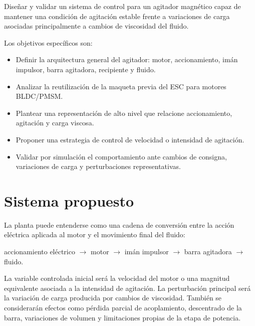 \documentclass[12pt,a4paper]{article}
\begin{document}
Diseñar y validar un sistema de control para un agitador magnético capaz de mantener una condición de agitación estable frente a variaciones de carga asociadas principalmente a cambios de viscosidad del fluido.

Los objetivos específicos son:

\begin{itemize}
    \item Definir la arquitectura general del agitador: motor, accionamiento, imán impulsor, barra agitadora, recipiente y fluido.
    \item Analizar la reutilización de la maqueta previa del ESC para motores BLDC/PMSM.
    \item Plantear una representación de alto nivel que relacione accionamiento, agitación y carga viscosa.
    \item Proponer una estrategia de control de velocidad o intensidad de agitación.
    \item Validar por simulación el comportamiento ante cambios de consigna, variaciones de carga y perturbaciones representativas.
\end{itemize}

\section{Sistema propuesto}

La planta puede entenderse como una cadena de conversión entre la acción eléctrica aplicada al motor y el movimiento final del fluido:

\begin{center}
    accionamiento eléctrico $\rightarrow$ motor $\rightarrow$ imán impulsor $\rightarrow$ barra agitadora $\rightarrow$ fluido.
\end{center}

La variable controlada inicial será la velocidad del motor o una magnitud equivalente asociada a la intensidad de agitación. La perturbación principal será la variación de carga producida por cambios de viscosidad. También se considerarán efectos como pérdida parcial de acoplamiento, descentrado de la barra, variaciones de volumen y limitaciones propias de la etapa de potencia.
\end{document}
